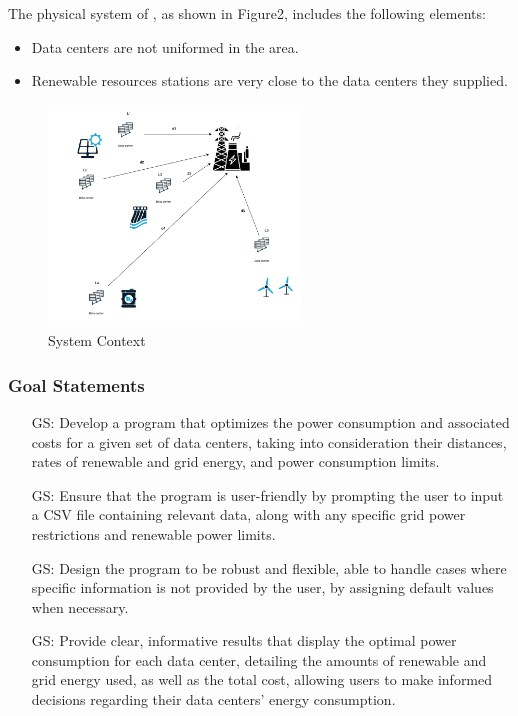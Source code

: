\documentclass[12pt]{article}
\newcounter{goalnum} %
\begin{document}
The physical system of \progname{}, as shown in Figure2,
includes the following elements:

\begin{itemize}

\item Data centers are not uniformed in the area.

\item Renewable resources stations are very close to the data centers they supplied.

\end{itemize}
\begin{figure}[h!]
\begin{center}
 \includegraphics[width=0.6\textwidth]{distributed model.pdf}
\caption{System Context}
\label{Fig_SystemContext} 
\end{center}
\end{figure}


\subsubsection{Goal Statements}


\begin{itemize}

\item[GS\refstepcounter{goalnum}\thegoalnum \label{G_meaningfulLabel}:] {Develop a program that optimizes the power consumption and associated costs for a given set of data centers, taking into consideration their distances, rates of renewable and grid energy, and power consumption limits.}
\item[GS\refstepcounter{goalnum}\thegoalnum \label{G_meaningfulLabel}:] { Ensure that the program is user-friendly by prompting the user to input a CSV file containing relevant data, along with any specific grid power restrictions and renewable power limits.}
\item[GS\refstepcounter{goalnum}\thegoalnum \label{G_meaningfulLabel}:] {Design the program to be robust and flexible, able to handle cases where specific information is not provided by the user, by assigning default values when necessary.}
\item[GS\refstepcounter{goalnum}\thegoalnum \label{G_meaningfulLabel}:] { Provide clear, informative results that display the optimal power consumption for each data center, detailing the amounts of renewable and grid energy used, as well as the total cost, allowing users to make informed decisions regarding their data centers' energy consumption.}
\end{itemize}
\end{document}
